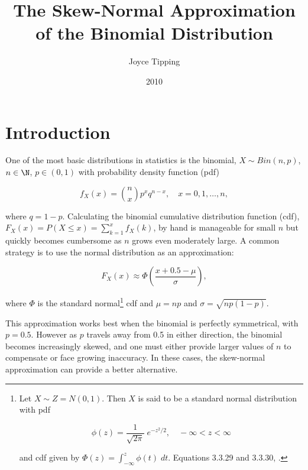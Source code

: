 \title{The Skew-Normal Approximation of the Binomial Distribution}
\author{Joyce Tipping}
\date{2010}
\maketitle

\section{Introduction}

One of the most basic distributions in statistics is the binomial, $X \sim
Bin(n,p)$, $n \in \N$, $p \in (0, 1)$ with probability density function (pdf)

\begin{equation*}
  f_X(x) = \binom{n}{x} p^x q^{n-x}, \quad x = 0, 1, \ldots, n,
\end{equation*}

where $q=1-p$. Calculating the binomial cumulative distribution function (cdf),
$F_X(x) = P(X \leq x) = \sum_{k=1}^x f_X(k)$, by hand is manageable for small
$n$ but quickly becomes cumbersome as $n$ grows even moderately large. A common
strategy is to use the normal distribution as an approximation:

\begin{equation}
  F_X(x) \approx \Phi \left( \frac{x + 0.5 - \mu}{\sigma} \right),
\end{equation}

where $\Phi$ is the standard normal\footnote{Let $X \sim Z = N(0, 1)$. Then $X$
is said to be a standard normal distribution with pdf

\begin{equation*}
  \phi(z) = \frac{1}{\sqrt{2\pi}} \; e^{-z^2/2}, \quad -\infty < z < \infty
\end{equation*}

and cdf given by $\Phi(z) = \int_{-\infty}^z \phi(t) \; dt$. Equations 3.3.29
and 3.3.30, \citet{textbook}.} cdf and $\mu = np$ and $\sigma =
\sqrt{np(1-p)}$.

This approximation works best when the binomial is perfectly symmetrical, with
$p=0.5$. However as $p$ travels away from 0.5 in either direction, the binomial
becomes increasingly skewed, and one must either provide larger values of $n$
to compensate or face growing inaccuracy. In these cases, the skew-normal
approximation can provide a better alternative.
